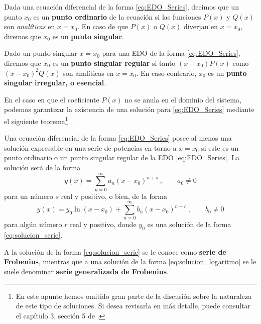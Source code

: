 \begin{defi} 
    Dada una ecuación diferencial de la forma \eqref{eq:EDO_Series}, decimos que un punto $x_0$ es un \textbf{punto ordinario} de la ecuación si las funciones $P(x)$ y $Q(x)$ son \emph{analíticas} en $x=x_0$. En caso de que $P(x)$ o $Q(x)$ diverjan en $x = x_0$, diremos que $x_0$ es un \textbf{punto singular}. 
\end{defi}

\begin{defi} 
    Dado un punto singular $x=x_0$ para una EDO de la forma \eqref{eq:EDO_Series}, diremos que $x_0$ es un \textbf{punto singular regular} si tanto $(x-x_0)P(x)$ como $(x-x_0)^2Q(x)$ son analíticas en $x=x_0$. En caso contrario, $x_0$ es un \textbf{punto singular irregular, o esencial}.
\end{defi}

En el caso en que el coeficiente $P(x)$ no se anula en el dominio del sistema, podemos garantizar la existencia de una solución para \eqref{eq:EDO_Series} mediante el siguiente teorema\footnote{En este apunte hemos omitido gran parte de la discusión sobre la naturaleza de este tipo de soluciones. Si desea revisarla en más detalle, puede consultar el capítulo 3, sección 5 de \cite{Butkov}.}
\begin{teorema}[de Fuchs]\label{teo:Fuchs}
    Una ecuación diferencial de la forma \eqref{eq:EDO_Series} posee al menos una solución expresable en una serie de potencias en torno a $x=x_0$ si este es un punto ordinario o un punto singular regular de la EDO \eqref{eq:EDO_Series}. La solución será de la forma 
    \begin{equation} \label{eq:solucion_serie}
        y(x) = \sum_{n=0}^\infty a_n(x-x_0)^{n+s} \ , \qquad a_0 \neq 0
    \end{equation}
    para un número $s$ real y positivo, o bien, de la forma 
    \begin{equation}\label{eq:solucion_logaritmo}
        y(x) = y_0 \ln(x-x_0) + \sum_{n=0}^\infty b_n (x-x_0)^{n+r} \ , \qquad b_0 \neq 0 
    \end{equation}
    para algún número $r$ real y positivo, donde $y_0$ es una solución de la forma \eqref{eq:solucion_serie}.

    A la solución de la forma \eqref{eq:solucion_serie} se le conoce como \textbf{serie de Frobenius}, mientras que a una solución de la forma \eqref{eq:solucion_logaritmo} se le suele denominar \textbf{serie generalizada de Frobenius}.
\end{teorema}

